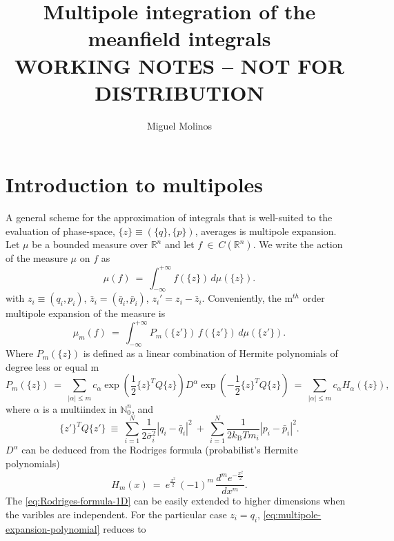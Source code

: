 \documentclass[11pt,a4paper]{article}
\author{Miguel Molinos}
\title{Multipole integration of the meanfield integrals \\ WORKING NOTES -- NOT FOR DISTRIBUTION }
\begin{document}
\maketitle

\section{Introduction to multipoles}
A general scheme for the approximation of integrals that is well-suited to the evaluation of phase-space, $\{{z}\} \equiv (\{{q}\}, \{{p}\})$, averages is multipole expansion.  Let $\mu$ be  a bounded measure over $\mathbb{R}^n$ and let $f\ \in\ C(\mathbb{R}^n)$.  We write the action of the measure $\mu$ on $f$ as
\begin{equation} \label{eq:bounded-measure}
\mu(f)\ =\ \int_{-\infty}^{+\infty} f(\{z\}) \, d\mu(\{z\}).
\end{equation}
with $z_i \equiv (q_i,p_i)$, $\bar{z}_i = (\bar{q}_i,\bar{p}_i)$, $z_i' = z_i - \bar{z}_i$. Conveniently, the m$^{th}$ order multipole expansion of the measure is
\begin{equation} \label{eq:bounded-measure-mp}
    \mu_m(f)\ =\ \int_{-\infty}^{+\infty} P_m(\{z'\}) \, f(\{z'\}) \, d\mu(\{z'\}).
\end{equation}
Where $P_m(\{{z}\})$ is defined as a linear combination of Hermite polynomials of degree less or equal m
\begin{equation}
    \label{eq:multipole-expansion-polynomial}
        P_m(\{{z}\})\
        =\
        \sum_{|\alpha|\leq m}
        c_\alpha
        \exp\left( \frac{1}{2} \{{z}\}^T Q \{{z}\} \right)
        D^\alpha
        \exp\left( - \frac{1}{2} \{{z}\}^T Q \{{z}\} \right)\
        =\
        \sum_{|\alpha|\leq m}
        c_\alpha
        H_\alpha(\{{z}\}),
\end{equation}
where $\alpha$ is a multiindex in $\mathbb{N}^n_0$, and 
\begin{equation}
    \{z'\}^T Q \{z'\}\
    \equiv\
    \sum_{i=1}^N \frac{1}{2\bar{\sigma}_i^2}|{q}_i - \bar{{q}}_i|^2\
    +\
    \sum_{i=1}^N \frac{1}{2k_{\text{B}}T m_i}|{p}_i - \bar{{p}}_i|^2 .
\end{equation}
$D^\alpha$ can be deduced from the Rodriges formula (probabilist's Hermite polynomials)
\begin{equation} \label{eq:Rodriges-formula-1D}
    H_m(x)\ =\ e^{\frac{x^2}{2}} \, (-1)^{m} \, \frac{d^m e^{-\frac{x^2}{2}}}{dx^m}.
\end{equation}
The \cref{eq:Rodriges-formula-1D} can be easily extended to higher dimensions when the varibles are independent. For the particular case $z_i = q_i$, \cref{eq:multipole-expansion-polynomial} reduces to
\end{document}
